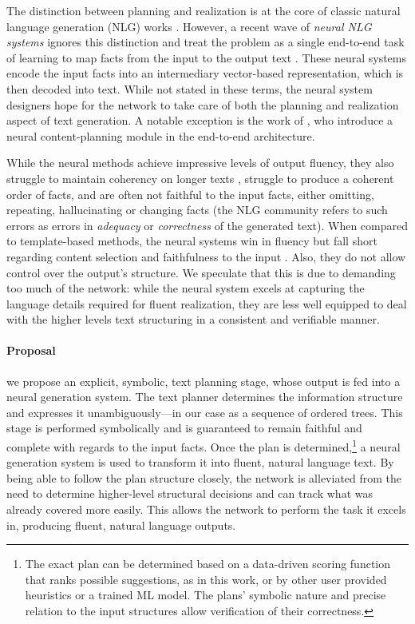 \documentclass[11pt,a4paper]{article}
\begin{document}
The distinction between planning and realization is at the core of classic natural language generation (NLG) works \cite{reiter2000building,DBLP:journals/corr/GattK17}. However, a recent wave of \emph{neural NLG systems} ignores this distinction and treat the problem as a single end-to-end task of learning to map facts from the input to the output text \cite{gardent2017webnlg,duvsek2018findings}. These neural systems encode the input facts into an intermediary vector-based representation, which is then decoded into text. While not stated in these terms, the neural system designers hope for the network to take care of both the planning and realization aspect of text generation. A notable exception is the work of \citet{puduppully2018data}, who introduce a neural content-planning module in the end-to-end architecture.


While the neural methods achieve impressive levels of output fluency, they also struggle to maintain coherency on longer texts \cite{wiseman2017challenges}, struggle to produce a coherent order of facts, and are often not faithful to the input facts, either omitting, repeating, hallucinating or changing facts (the NLG community refers to such errors as errors in \emph{adequacy} or \emph{correctness} of the generated text).
When compared to template-based methods, the neural systems win in fluency but fall short regarding content selection and faithfulness to the input \cite{puzikov2018e2e}. Also, they do not allow control over the output's structure.
We speculate that this is due to demanding too much of the network: while the neural system excels at capturing the language details required for fluent realization, they are less well equipped to deal with the higher levels text structuring in a consistent and verifiable manner.

\paragraph{Proposal} we propose an explicit, symbolic, text planning stage, whose output is fed into a neural generation system. The text planner determines the information structure and expresses it unambiguously---in our case as a sequence of ordered trees. This stage is performed symbolically and is guaranteed to remain faithful and complete with regards to the input facts. Once the plan is determined,\footnote{The exact plan can be determined based on a data-driven scoring function that ranks possible suggestions, as in this work, or by other user provided heuristics or a trained ML model. The plans' symbolic nature and precise relation to the input structures allow verification of their correctness.} a neural generation system is used to transform it into fluent, natural language text. By being able to follow the plan structure closely, the network is alleviated from the need to determine higher-level structural decisions and can track what was already covered more easily. This allows the network to perform the task it excels in, producing fluent, natural language outputs.
\end{document}
